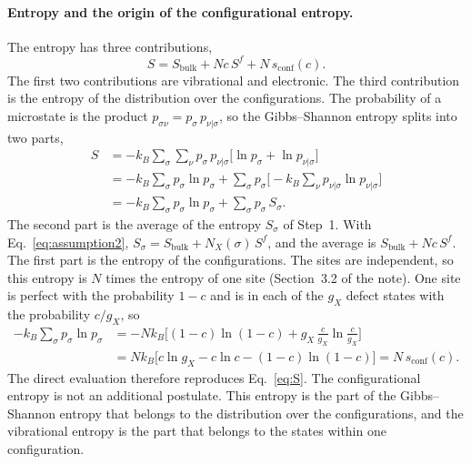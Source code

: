\documentclass[11pt]{article}      %
\numberwithin{equation}{section}   %
\begin{document}
\paragraph{Entropy and the origin of the configurational entropy.}
The entropy has three contributions,
\begin{equation}
    \boxed{S=S_{\text{bulk}}+Nc\,S^f+N\,s_{\text{conf}}(c).}
    \label{eq:S}
\end{equation}
The first two contributions are vibrational and electronic. The third
contribution is the entropy of the distribution over the configurations.
The probability of a microstate is the product
$p_{\sigma\nu}=p_\sigma\,p_{\nu|\sigma}$, so the Gibbs--Shannon entropy
splits into two parts,
\begin{align*}
    S&=-k_B\sum_{\sigma}\sum_{\nu}p_\sigma\,p_{\nu|\sigma}
    \big[\ln p_\sigma+\ln p_{\nu|\sigma}\big]\\
    &=-k_B\sum_{\sigma}p_\sigma\ln p_\sigma
    +\sum_{\sigma}p_\sigma\Big[-k_B\sum_\nu p_{\nu|\sigma}\ln p_{\nu|\sigma}\Big]\\
    &=-k_B\sum_{\sigma}p_\sigma\ln p_\sigma+\sum_{\sigma}p_\sigma\,S_\sigma.
\end{align*}
The second part is the average of the entropy $S_\sigma$ of Step~1. With
Eq.~\eqref{eq:assumption2}, $S_\sigma=S_{\text{bulk}}+N_X(\sigma)\,S^f$, and
the average is $S_{\text{bulk}}+Nc\,S^f$. The first part is the entropy of
the configurations. The sites are independent, so this entropy is $N$ times
the entropy of one site (Section~3.2 of the note). One site is perfect with
the probability $1-c$ and is in each of the $g_X$ defect states with the
probability $c/g_X$, so
\begin{align*}
    -k_B\sum_{\sigma}p_\sigma\ln p_\sigma
    &=-Nk_B\Big[(1-c)\ln(1-c)+g_X\,\frac{c}{g_X}\ln\frac{c}{g_X}\Big]\\
    &=Nk_B\big[c\ln g_X-c\ln c-(1-c)\ln(1-c)\big]
    =N\,s_{\text{conf}}(c).
\end{align*}
The direct evaluation therefore reproduces Eq.~\eqref{eq:S}. The
configurational entropy is not an additional postulate. This entropy is the
part of the Gibbs--Shannon entropy that belongs to the distribution over the
configurations, and the vibrational entropy is the part that belongs to the
states within one configuration.
\end{document}
